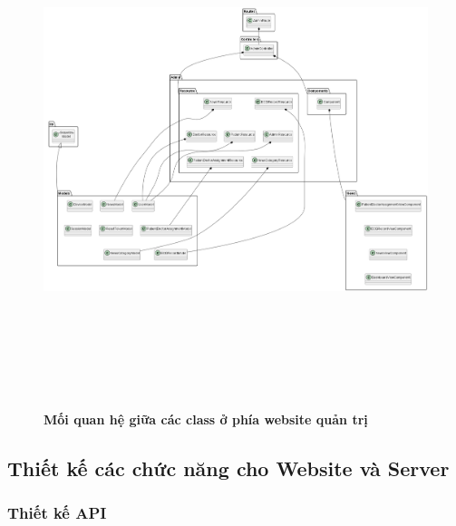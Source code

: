 \begin{enumerate}[a)]
\begin{figure}[H]
  \centering
  \includegraphics[width=16cm,height=15cm]{Images/server/class/class_admin_relation.png}
  \caption[Mối quan hệ giữa các class ở phía website quản trị]{\bfseries \fontsize{12pt}{0pt}\selectfont Mối quan hệ giữa các class ở phía website quản trị}
  \label{class_admin_relation} %
\end{figure}

\end{enumerate}



\subsection{Thiết kế các chức năng cho Website và Server}

\subsubsection{Thiết kế API}


